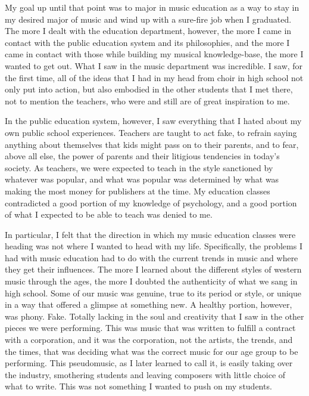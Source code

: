 My goal up until that point was to major in music education as a way to stay in my desired major of music and wind up with a sure-fire job when I graduated. The more I dealt with the education department, however, the more I came in contact with the public education system and its philosophies, and the more I came in contact with those while building my musical knowledge-base, the more I wanted to get out. What I saw in the music department was incredible. I saw, for the first time, all of the ideas that I had in my head from choir in high school not only put into action, but also embodied in the other students that I met there, not to mention the teachers, who were and still are of great inspiration to me.

In the public education system, however, I saw everything that I hated about my own public school experiences. Teachers are taught to act fake, to refrain saying anything about themselves that kids might pass on to their parents, and to fear, above all else, the power of parents and their litigious tendencies in today's society. As teachers, we were expected to teach in the style sanctioned by whatever was popular, and what was popular was determined by what was making the most money for publishers at the time. My education classes contradicted a good portion of my knowledge of psychology, and a good portion of what I expected to be able to teach was denied to me.

In particular, I felt that the direction in which my music education classes were heading was not where I wanted to head with my life. Specifically, the problems I had with music education had to do with the current trends in music and where they get their influences. The more I learned about the different styles of western music through the ages, the more I doubted the authenticity of what we sang in high school. Some of our music was genuine, true to its period or style, or unique in a way that offered a glimpse at something new. A healthy portion, however, was phony. Fake. Totally lacking in the soul and creativity that I saw in the other pieces we were performing. This was music that was written to fulfill a contract with a corporation, and it was the corporation, not the artists, the trends, and the times, that was deciding what was the correct music for our age group to be performing. This pseudomusic, as I later learned to call it, is easily taking over the industry, smothering students and leaving composers with little choice of what to write. This was not something I wanted to push on my students.

